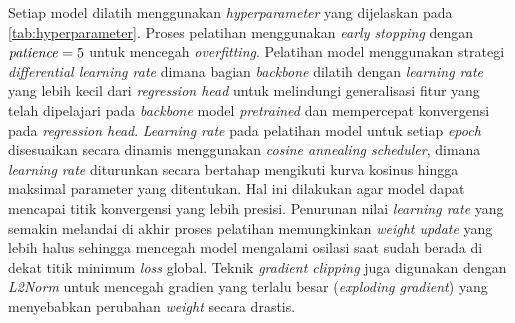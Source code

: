 Setiap model dilatih menggunakan \textit{hyperparameter} yang dijelaskan pada \autoref{tab:hyperparameter}. Proses pelatihan menggunakan \textit{early stopping} dengan $\text{\textit{patience}} = 5$ untuk mencegah \textit{overfitting}. Pelatihan model menggunakan strategi \textit{differential learning rate} dimana bagian \textit{backbone} dilatih dengan \textit{learning rate} yang lebih kecil dari \textit{regression head} untuk melindungi generalisasi fitur yang telah dipelajari pada \textit{backbone} model \textit{pretrained} dan mempercepat konvergensi pada \textit{regression head}. \textit{Learning rate} pada pelatihan model untuk setiap \textit{epoch} disesuaikan secara dinamis menggunakan \textit{cosine annealing scheduler}, dimana \textit{learning rate} diturunkan secara bertahap mengikuti kurva kosinus hingga maksimal parameter yang ditentukan. Hal ini dilakukan agar model dapat mencapai titik konvergensi yang lebih presisi. Penurunan nilai \textit{learning rate} yang semakin melandai di akhir proses pelatihan memungkinkan \textit{weight update} yang lebih halus sehingga mencegah model mengalami osilasi saat sudah berada di dekat titik minimum \textit{loss} global. Teknik \textit{gradient clipping} juga digunakan dengan \textit{L2Norm} untuk mencegah gradien yang terlalu besar (\textit{exploding gradient}) yang menyebabkan perubahan \textit{weight} secara drastis.


